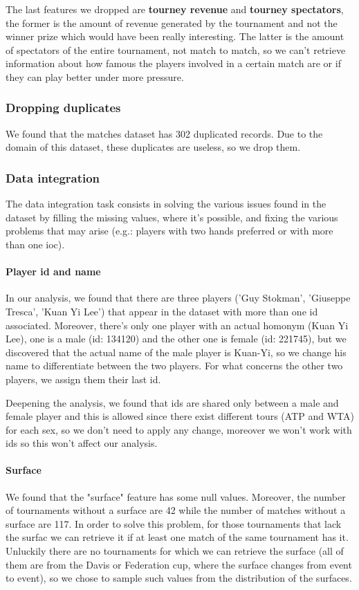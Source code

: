 The last features we dropped are \textbf{tourney revenue} and \textbf{tourney spectators}, the former is the amount of revenue generated by the tournament and not the winner prize which would have been really interesting. The latter is the amount of spectators of the entire tournament, not match to match, so we can't retrieve information about how famous the players involved in a certain match are or if they can play better under more pressure.

\subsubsection{Dropping duplicates}
We found that the matches dataset has 302 duplicated records. Due to the domain of this dataset, these duplicates are useless, so we drop them.

\subsubsection{Data integration}
The data integration task consists in solving the various issues found in the dataset by filling the missing values, where it's possible, and fixing the various problems that may arise (e.g.: players with two hands preferred or with more than one ioc).
\paragraph{Player id and name}
In our analysis, we found that there are three players ('Guy Stokman', 'Giuseppe Tresca', 'Kuan Yi Lee') that appear in the dataset with more than one id associated. Moreover, there's only one player with an actual homonym (Kuan Yi Lee), one is a male (id: 134120) and the other one is female (id: 221745), but we discovered that the actual name of the male player is Kuan-Yi, so we change his name to differentiate between the two players. For what concerns the other two players, we assign them their last id.

Deepening the analysis, we found that ids are shared only between a male and female player and this is allowed since there exist different tours (ATP and WTA) for each sex, so we don't need to apply any change, moreover we won't work with ids so this won't affect our analysis.

\paragraph{Surface}
We found that the "surface" feature has some null values. Moreover, the number of tournaments without a surface are 42 while the number of matches without a surface are 117. In order to solve this problem, for those tournaments that lack the surfac  we can retrieve it if at least one match of the same tournament has it. Unluckily there are no tournaments for which we can retrieve the surface (all of them are from the Davis or Federation cup, where the surface changes from event to event), so we chose to sample such values from the distribution of the surfaces.

